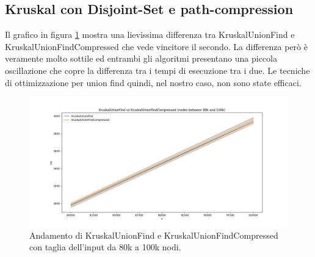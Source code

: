 \subsection{Kruskal con Disjoint-Set e path-compression}

Il grafico in figura \ref{fig:Kruskal-KruskalCompressed-80k-100k} mostra una lievissima differenza tra KruskalUnionFind e KruskalUnionFindCompressed che vede vincitore il secondo. La differenza però è veramente molto sottile ed entrambi gli algoritmi presentano una piccola oscillazione che copre la differenza tra i tempi di esecuzione tra i due. Le tecniche di ottimizzazione per union find quindi, nel nostro caso, non sono state efficaci.

\begin{figure}[H]
    \centering
    \includegraphics[width=1.0\textwidth]{./images/KruskalUnionFind_vs_KruskalUnionFindCompressed_(nodes_between_80k_and_100k).png}
	\caption{Andamento di KruskalUnionFind e KruskalUnionFindCompressed con taglia dell'input da 80k a 100k nodi.}
    \label{fig:Kruskal-KruskalCompressed-80k-100k}
\end{figure}

